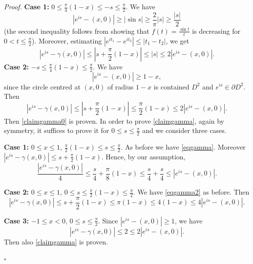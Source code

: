\documentclass[10pt,a4paper]{amsart}
\newenvironment{proof}{\noindent\emph{Proof.}}{\hfill$\square$\medskip}
\begin{document}
\begin{proof}
\noindent\textbf{Case 1:} $0\le \frac{\pi}{4}(1-x)\le -s\le\frac{\pi}{2}$. 
We have
\begin{equation}\label{eqgamma}
|e^{is}-(x,0)|\ge |\sin s| \ge \frac{2}{\pi}|s|\ge\frac{|s|}{2}
\end{equation}
(the second inequality follows from showing that $f(t)=\frac{\sin t}{t}$ is decreasing for $0<t\le \frac{\pi}{2}$).
Moreover, estimating $|e^{it_1}-e^{it_2}|\le |t_1-t_2|$, we get
$$|e^{is}-\gamma(x,0)|\le \left|s+\frac{\pi}{2}(1-x)\right|\le |s|\le 2  |e^{is}-(x,0)|.$$
\noindent\textbf{Case 2:} $-s\le \frac{\pi}{4}(1-x)\le \frac{\pi}{2}$. We have
\begin{equation}\label{eqgamma2}
|e^{is}-(x,0)|\ge 1-x,
\end{equation}
since the circle centred at $(x,0)$ of radius $1-x$ is contained $D^2$ and $e^{is}\in \partial D^2$. Then
$$|e^{is}-\gamma(x,0)|\le \left|s+\frac{\pi}{2}(1-x)\right|\le \frac{\pi}{2}(1-x) \le  2|e^{is}-(x,0)|.$$
Then \eqref{claimgamma0} is proven. In order to prove \eqref{claimgamma}, again by symmetry, it suffices to prove it for $0\le s\le \frac{\pi}{2}$ and we consider three cases.


\noindent\textbf{Case 1:} $0\le x\le 1$, $ \frac{\pi}{2}(1-x)\le s\le \frac{\pi}{2}$.
As before we have \eqref{eqgamma}.
Moreover $|e^{is}-\gamma(x,0)|\le s+\frac{\pi}{2}(1-x)$.  Hence, by our assumption,
$$\frac{|e^{is}-\gamma(x,0)|}{4}\le \frac{s}{4}+ \frac{\pi}{8}(1-x)\le \frac{s}{4}+\frac{s}{4}\le |e^{is}-(x,0)|.$$

\noindent\textbf{Case 2:} $0\le x\le 1$, $0\le s\le \frac{\pi}{2}(1-x)\le \frac{\pi}{2}$. We have \eqref{eqgamma2} as before. Then
$$|e^{is}-\gamma(x,0)|\le s+\frac{\pi}{2}(1-x)\le \pi (1-x)\le 4(1-x)\le 4 |e^{is}-(x,0)|.$$

\noindent\textbf{Case 3:} $-1\le  x< 0$, $0\le s\le \frac{\pi}{2}$. Since
$|e^{is}-(x,0)|\ge 1$, we have
$$|e^{is}-\gamma(x,0)|\le 2 \le  2 |e^{is}-(x,0)|. $$
Then also \eqref{claimgamma} is proven.

\medskip



\end{proof}
\end{document}
